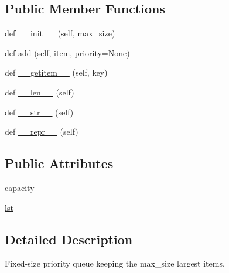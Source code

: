 \subsection*{Public Member Functions}
\begin{DoxyCompactItemize}
\item 
def \hyperlink{classparlai_1_1agents_1_1ir__baseline_1_1ir__baseline_1_1MaxPriorityQueue_a33145693ab371c9f96cb8339fd4a39c3}{\+\_\+\+\_\+init\+\_\+\+\_\+} (self, max\+\_\+size)
\item 
def \hyperlink{classparlai_1_1agents_1_1ir__baseline_1_1ir__baseline_1_1MaxPriorityQueue_ad55d735d26bc038f7a552b1789036033}{add} (self, item, priority=None)
\item 
def \hyperlink{classparlai_1_1agents_1_1ir__baseline_1_1ir__baseline_1_1MaxPriorityQueue_a7830895ac98617df15af4ba0fb991a05}{\+\_\+\+\_\+getitem\+\_\+\+\_\+} (self, key)
\item 
def \hyperlink{classparlai_1_1agents_1_1ir__baseline_1_1ir__baseline_1_1MaxPriorityQueue_a7b1b8f3a2f17a0d4bd3c202bc3bdee78}{\+\_\+\+\_\+len\+\_\+\+\_\+} (self)
\item 
def \hyperlink{classparlai_1_1agents_1_1ir__baseline_1_1ir__baseline_1_1MaxPriorityQueue_a16e80c3c0f52236d14e5e1813a7c9c52}{\+\_\+\+\_\+str\+\_\+\+\_\+} (self)
\item 
def \hyperlink{classparlai_1_1agents_1_1ir__baseline_1_1ir__baseline_1_1MaxPriorityQueue_a0d0d7db0cf816039ca69cba4bf481f01}{\+\_\+\+\_\+repr\+\_\+\+\_\+} (self)
\end{DoxyCompactItemize}
\subsection*{Public Attributes}
\begin{DoxyCompactItemize}
\item 
\hyperlink{classparlai_1_1agents_1_1ir__baseline_1_1ir__baseline_1_1MaxPriorityQueue_a7d35dfdbd0e65d15b701e1b3275e6d89}{capacity}
\item 
\hyperlink{classparlai_1_1agents_1_1ir__baseline_1_1ir__baseline_1_1MaxPriorityQueue_a9e5cc3e3c70101f251f2d19cf936aa4e}{lst}
\end{DoxyCompactItemize}


\subsection{Detailed Description}
\begin{DoxyVerb}Fixed-size priority queue keeping the max_size largest items.
\end{DoxyVerb}
 

